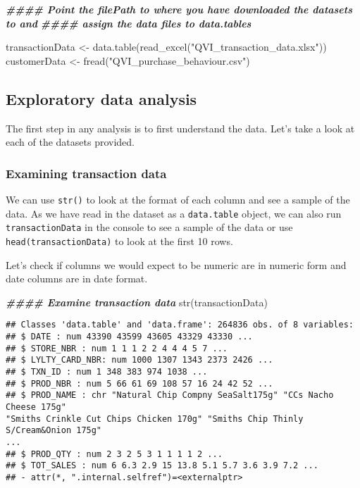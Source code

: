 \documentclass[
]{article}
\newenvironment{Shaded}{\begin{snugshade}}{\end{snugshade}}
\newcommand{\DocumentationTok}[1]{\textcolor[rgb]{0.56,0.35,0.01}{\textbf{\textit{#1}}}}
\newcommand{\FunctionTok}[1]{\textcolor[rgb]{0.00,0.00,0.00}{#1}}
\newcommand{\NormalTok}[1]{#1}
\newcommand{\OtherTok}[1]{\textcolor[rgb]{0.56,0.35,0.01}{#1}}
\newcommand{\StringTok}[1]{\textcolor[rgb]{0.31,0.60,0.02}{#1}}
\begin{document}
\begin{Shaded}
\begin{Highlighting}[]
\DocumentationTok{\#\#\#\# Point the filePath to where you have downloaded the datasets to and}
\DocumentationTok{\#\#\#\# assign the data files to data.tables}

\NormalTok{transactionData }\OtherTok{\textless{}{-}} \FunctionTok{data.table}\NormalTok{(}\FunctionTok{read\_excel}\NormalTok{(}\StringTok{"QVI\_transaction\_data.xlsx"}\NormalTok{))}
\NormalTok{customerData }\OtherTok{\textless{}{-}} \FunctionTok{fread}\NormalTok{(}\StringTok{"QVI\_purchase\_behaviour.csv"}\NormalTok{)}
\end{Highlighting}
\end{Shaded}

\hypertarget{exploratory-data-analysis}{%
\subsection{Exploratory data analysis}\label{exploratory-data-analysis}}

The first step in any analysis is to first understand the data. Let's
take a look at each of the datasets provided.

\hypertarget{examining-transaction-data}{%
\subsubsection{Examining transaction
data}\label{examining-transaction-data}}

We can use \texttt{str()} to look at the format of each column and see a
sample of the data. As we have read in the dataset as a
\texttt{data.table} object, we can also run \texttt{transactionData} in
the console to see a sample of the data or use
\texttt{head(transactionData)} to look at the first 10 rows.

Let's check if columns we would expect to be numeric are in numeric form
and date columns are in date format.

\begin{Shaded}
\begin{Highlighting}[]
\DocumentationTok{\#\#\#\# Examine transaction data}
\FunctionTok{str}\NormalTok{(transactionData)}
\end{Highlighting}
\end{Shaded}

\begin{verbatim}
## Classes 'data.table' and 'data.frame': 264836 obs. of 8 variables:
## $ DATE : num 43390 43599 43605 43329 43330 ...
## $ STORE_NBR : num 1 1 1 2 2 4 4 4 5 7 ...
## $ LYLTY_CARD_NBR: num 1000 1307 1343 2373 2426 ...
## $ TXN_ID : num 1 348 383 974 1038 ...
## $ PROD_NBR : num 5 66 61 69 108 57 16 24 42 52 ...
## $ PROD_NAME : chr "Natural Chip Compny SeaSalt175g" "CCs Nacho Cheese 175g"
"Smiths Crinkle Cut Chips Chicken 170g" "Smiths Chip Thinly S/Cream&Onion 175g"
...
## $ PROD_QTY : num 2 3 2 5 3 1 1 1 1 2 ...
## $ TOT_SALES : num 6 6.3 2.9 15 13.8 5.1 5.7 3.6 3.9 7.2 ...
## - attr(*, ".internal.selfref")=<externalptr>
\end{verbatim}
\end{document}
